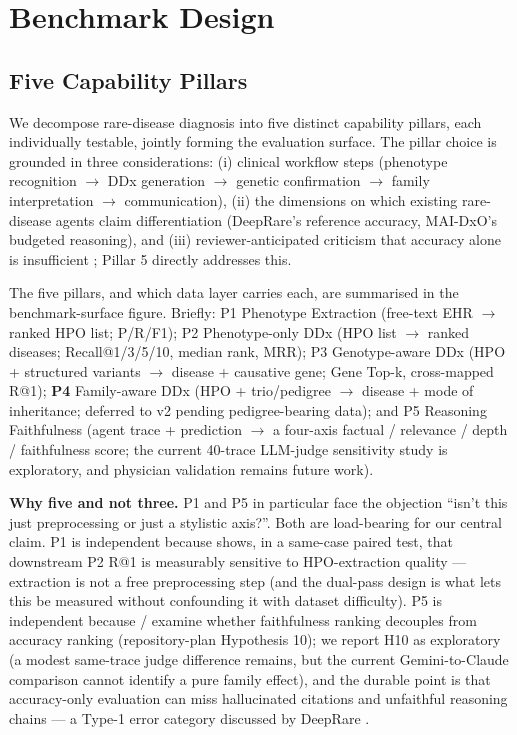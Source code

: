\section{Benchmark Design}\label{sec-4}

\subsection{Five Capability Pillars}\label{sec-4-1}

We decompose rare-disease diagnosis into five distinct capability pillars, each individually testable, jointly forming the evaluation surface. The pillar choice is grounded in three considerations: (i) clinical workflow steps (phenotype recognition \ensuremath{\rightarrow} DDx generation \ensuremath{\rightarrow} genetic confirmation \ensuremath{\rightarrow} family interpretation \ensuremath{\rightarrow} communication), (ii) the dimensions on which existing rare-disease agents claim differentiation (DeepRare's reference accuracy, MAI-DxO's budgeted reasoning), and (iii) reviewer-anticipated criticism that accuracy alone is insufficient \citep{equitymedqa2024}; Pillar 5 directly addresses this.

The five pillars, and which data layer carries each, are summarised in the
benchmark-surface figure. Briefly: P1 Phenotype Extraction (free-text EHR
\ensuremath{\rightarrow} ranked HPO list; P/R/F1); P2 Phenotype-only DDx (HPO list \ensuremath{\rightarrow} ranked
diseases; Recall@1/3/5/10, median rank, MRR); P3 Genotype-aware DDx (HPO +
structured variants \ensuremath{\rightarrow} disease + causative gene; Gene Top-k, cross-mapped R@1);
\textbf{P4} Family-aware DDx (HPO + trio/pedigree \ensuremath{\rightarrow} disease + mode of inheritance;
deferred to v2 pending pedigree-bearing data); and P5 Reasoning
Faithfulness (agent trace + prediction \ensuremath{\rightarrow} a four-axis factual / relevance /
depth / faithfulness score; the current 40-trace LLM-judge sensitivity study
is exploratory, and physician validation remains future work).

\textbf{Why five and not three.} P1 and P5 in particular face the objection ``isn't this just preprocessing or just a stylistic axis?''. Both are load-bearing for our central claim. P1 is independent because  shows, in a same-case paired test, that downstream P2 R@1 is measurably sensitive to HPO-extraction quality --- extraction is not a free preprocessing step (and the dual-pass design is what lets this be measured without confounding it with dataset difficulty). P5 is independent because / examine whether faithfulness ranking decouples from accuracy ranking (repository-plan Hypothesis 10); we report H10 as exploratory (a modest same-trace judge difference remains, but the current Gemini-to-Claude comparison cannot identify a pure family effect), and the durable point is that accuracy-only evaluation can miss hallucinated citations and unfaithful reasoning chains --- a Type-1 error category discussed by DeepRare \citep{deeprare2026}.

